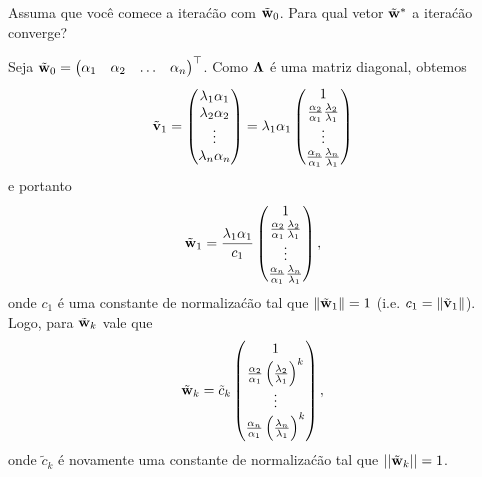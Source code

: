 \begin{exenumerate}
\begin{solution}
    \end{solution}
    
    
    \item Assuma que voc\^e comece a itera\'c\~ao com $\tilde{\mathbf{w}}_{0}$. Para qual vetor $\tilde{\mathbf{w}}^{\ast}$ a itera\'c\~ao converge? 
    
    \begin{solution}
        Seja $\tilde{\mathbf{w}}_0 = \begin{pmatrix} \alpha_1 & \alpha_2 & \ldots & \alpha_n \end{pmatrix}^\top$. Como $\mathbf{\Lambda}$ \'e uma matriz diagonal, obtemos
        \begin{align}
            \tilde{\mathbf{v}}_1 &=  
            \begin{pmatrix} 
                \lambda_1\alpha_1 \\ 
                \lambda_2\alpha_2 \\ 
                \vdots \\ 
                \lambda_n\alpha_n 
            \end{pmatrix} 
            = 
            \lambda_1\alpha_1
            \begin{pmatrix} 
                1 \\ 
                \frac{\alpha_2}{\alpha_1}\frac{\lambda_2}{\lambda_1} \\ 
                \vdots \\ 
                \frac{\alpha_n}{\alpha_1}\frac{\lambda_n}{\lambda_1}
            \end{pmatrix}
        \end{align}
        e portanto 
        \begin{align}
            \tilde{\mathbf{w}}_1 &= \frac{\lambda_1\alpha_1}{c_1}
            \begin{pmatrix} 1 \\
                \frac{\alpha_2}{\alpha_1}\frac{\lambda_2}{\lambda_1} \\ 
                \vdots \\ 
                \frac{\alpha_n}{\alpha_1}\frac{\lambda_n}{\lambda_1}
            \end{pmatrix},
        \end{align}
        onde $c_1$ \'e uma constante de normaliza\'c\~ao tal que $\|\tilde{\mathbf{w}}_1\| = 1$ (i.e. $c_1 = \|\tilde{\mathbf{v}}_1\|$). Logo, para $\tilde{\mathbf{w}}_k$ vale que
        \begin{align}
            \tilde{\mathbf{w}}_k &= \tilde{c}_k 
            \begin{pmatrix}
                1 \\
                \frac{\alpha_2}{\alpha_1}\left(\frac{\lambda_2}{\lambda_1}\right)^k \\
                \vdots \\
                \frac{\alpha_n}{\alpha_1}\left(\frac{\lambda_n}{\lambda_1}\right)^k 
            \end{pmatrix},
        \end{align}
        onde $\tilde{c}_k$ \'e novamente uma constante de normaliza\'c\~ao tal que $||\tilde{\mathbf{w}}_k|| = 1$.
        

\end{solution}
\end{exenumerate}
